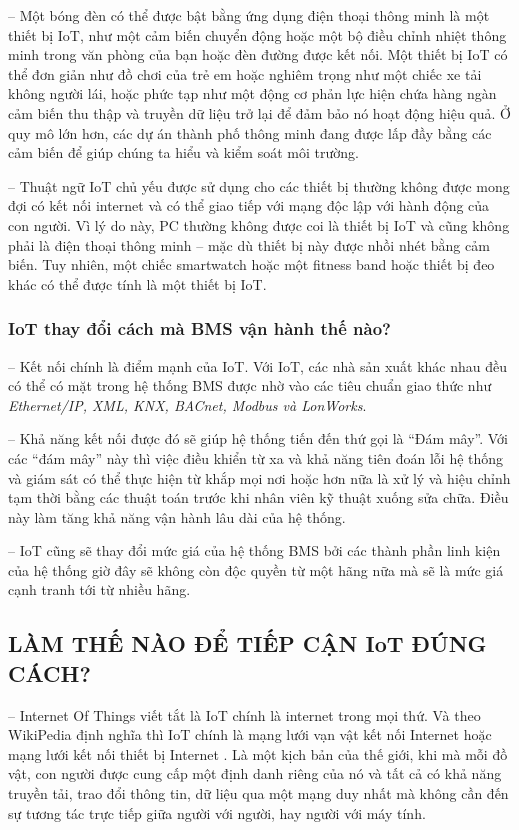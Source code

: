 	-- Một bóng đèn có thể được bật bằng ứng dụng điện thoại thông minh là một thiết bị IoT, như một cảm biến chuyển động hoặc một bộ điều chỉnh nhiệt thông minh trong văn phòng của bạn hoặc đèn đường được kết nối. Một thiết bị IoT có thể đơn giản như đồ chơi của trẻ em hoặc nghiêm trọng như một chiếc xe tải không người lái, hoặc phức tạp như một động cơ phản lực hiện chứa hàng ngàn cảm biến thu thập và truyền dữ liệu trở lại để đảm bảo nó hoạt động hiệu quả. Ở quy mô lớn hơn, các dự án thành phố thông minh đang được lấp đầy bằng các cảm biến để giúp chúng ta hiểu và kiểm soát môi trường.

	-- Thuật ngữ IoT chủ yếu được sử dụng cho các thiết bị thường không được mong đợi có kết nối internet và có thể giao tiếp với mạng độc lập với hành động của con người. Vì lý do này, PC thường không được coi là thiết bị IoT và cũng không phải là điện thoại thông minh – mặc dù thiết bị này được nhồi nhét bằng cảm biến. Tuy nhiên, một chiếc smartwatch hoặc một fitness band hoặc thiết bị đeo khác có thể được tính là một thiết bị IoT.
	
	\subsubsection{IoT thay đổi cách mà BMS vận hành thế nào?}
	-- Kết nối chính là điểm mạnh của IoT. Với IoT, các nhà sản xuất khác nhau đều có thể có mặt trong hệ thống BMS được nhờ vào các tiêu chuẩn giao thức như \emph{Ethernet/IP, XML, KNX, BACnet, Modbus và LonWorks}. 

	-- Khả năng kết nối được đó sẽ giúp hệ thống tiến đến thứ gọi là ``Đám mây''. Với các ``đám mây'' này thì việc điều khiển từ xa và khả năng tiên đoán lỗi hệ thống và giám sát có thể thực hiện từ khắp mọi nơi hoặc hơn nữa là xử lý và hiệu chỉnh tạm thời bằng các thuật toán trước khi nhân viên kỹ thuật xuống sửa chữa. Điều này làm tăng khả năng vận hành lâu dài của hệ thống.
	
	-- IoT cũng sẽ thay đổi mức giá của hệ thống BMS bởi các thành phần linh kiện của hệ thống giờ đây sẽ không còn độc quyền từ một hãng nữa mà sẽ là mức giá cạnh tranh tới từ nhiều hãng.
	\subsection{LÀM THẾ NÀO ĐỂ TIẾP CẬN IoT ĐÚNG CÁCH?}
	-- Internet Of Things viết tắt là IoT chính là internet trong mọi thứ. Và theo WikiPedia định nghĩa thì IoT chính là mạng lưới vạn vật kết nối Internet hoặc mạng lưới kết nối thiết bị Internet . Là một kịch bản của thế giới, khi mà mỗi đồ vật, con người được cung cấp một định danh riêng của nó và tất cả có khả năng truyền tải, trao đổi thông tin, dữ liệu qua một mạng duy nhất mà không cần đến sự tương tác trực tiếp giữa người với người, hay người với máy tính.
	
